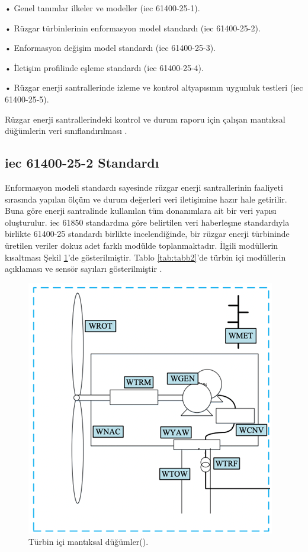 •	Genel tanımlar ilkeler ve modeller (\gls{iec} 61400-25-1).

•	Rüzgar türbinlerinin enformasyon model standardı (\gls{iec} 61400-25-2).

•	Enformasyon değişim model standardı (\gls{iec} 61400-25-3).

•	İletişim profilinde eşleme standardı (\gls{iec} 61400-25-4).

•	Rüzgar enerji santrallerinde izleme ve kontrol altyapısının uygunluk testleri (\gls{iec} 61400-25-5).

Rüzgar enerji santrallerindeki kontrol ve durum raporu için çalışan mantıksal düğümlerin veri sınıflandırılması \cite{Olsen_prototypeof}.

\subsection{\gls{iec} 61400-25-2 Standardı}

Enformasyon modeli standardı sayesinde rüzgar enerji santrallerinin faaliyeti sırasında yapılan ölçüm ve durum değerleri veri iletişimine hazır hale getirilir. Buna göre enerji santralinde kullanılan tüm donanımlara ait bir veri yapısı oluşturulur. \gls{iec} 61850 standardına göre belirtilen veri haberleşme standardıyla birlikte 61400-25 standardı birlikte incelendiğinde, bir rüzgar enerji türbininde üretilen veriler dokuz adet farklı modülde toplanmaktadır. İlgili modüllerin kısaltması Şekil \ref{fig:figure15}’de gösterilmiştir. Tablo \ref{tab:tabb2}’de türbin içi modüllerin açıklaması ve sensör sayıları gösterilmiştir \cite{francisco2016protection}\cite{trinnass}\cite{san2007use}.



\begin{figure}[htbp]
\centerline{\includegraphics[width=\columnwidth]{Resim/Sekil4-1.png}}
\caption{Türbin içi mantıksal düğümler(\protect{}).}
\label{fig:figure15}
\end{figure}


